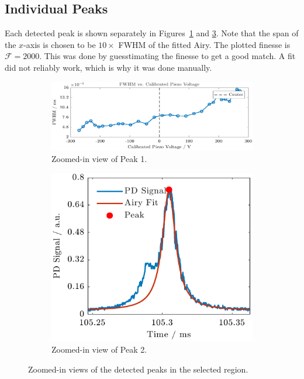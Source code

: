 \documentclass[a4paper,11pt]{article}
\begin{document}
\subsection{Individual Peaks}
Each detected peak is shown separately in Figures~\ref{fig:peak1} and \ref{fig:peak2}.
Note that the span of the $x$-axis is chosen to be $10 \times$ FWHM of the fitted Airy.
The plotted finesse is $\mathcal{F}=2000$. This was done by guesstimating the finesse to get a good match.
A fit did not reliably work, which is why it was done manually.

\begin{figure}[H]
    \centering
    \begin{subfigure}[t]{0.48\textwidth}
        \centering
        \includegraphics[width=\textwidth]{Figure_3.pdf}
        \caption{Zoomed-in view of Peak 1.}
        \label{fig:peak1}
    \end{subfigure}
    \hfill
    \begin{subfigure}[t]{0.48\textwidth}
        \centering
        \includegraphics[width=\textwidth]{Figure_4.pdf}
        \caption{Zoomed-in view of Peak 2.}
        \label{fig:peak2}
    \end{subfigure}
    \caption{Zoomed-in views of the detected peaks in the selected region.}
\end{figure}
\end{document}
